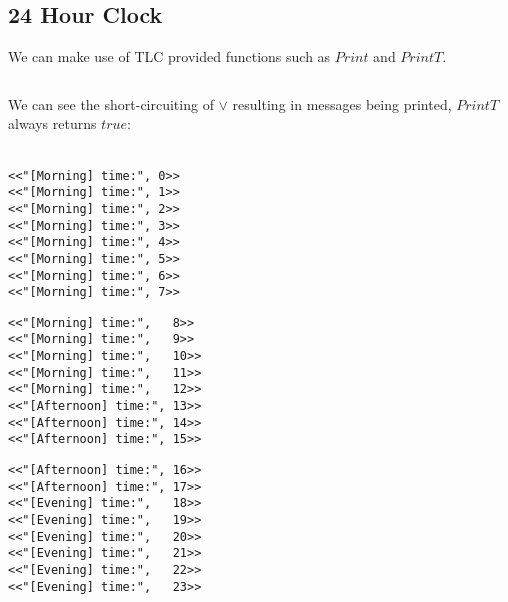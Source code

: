 \subsection{24 Hour Clock}
We can make use of TLC provided functions such as $Print$ and $PrintT$.
\\

\inputminted{text}{tla_plus/code/24HourClock.tla}
We can see the short-circuiting of $\lor$ resulting in messages being printed, $PrintT$ always returns $true$:
\\
\\ \begin{minipage}{.33\textwidth}
\begin{verbatim}
<<"[Morning] time:", 0>>
<<"[Morning] time:", 1>>
<<"[Morning] time:", 2>>
<<"[Morning] time:", 3>>
<<"[Morning] time:", 4>>
<<"[Morning] time:", 5>>
<<"[Morning] time:", 6>>
<<"[Morning] time:", 7>>
\end{verbatim}  
\end{minipage}
\begin{minipage}{.33\textwidth}
\begin{verbatim}
<<"[Morning] time:",   8>>
<<"[Morning] time:",   9>>
<<"[Morning] time:",   10>>
<<"[Morning] time:",   11>>
<<"[Morning] time:",   12>>
<<"[Afternoon] time:", 13>>
<<"[Afternoon] time:", 14>>
<<"[Afternoon] time:", 15>>
\end{verbatim}
\end{minipage}
\begin{minipage}{.33\textwidth}
\begin{verbatim}
<<"[Afternoon] time:", 16>>
<<"[Afternoon] time:", 17>>
<<"[Evening] time:",   18>>
<<"[Evening] time:",   19>>
<<"[Evening] time:",   20>>
<<"[Evening] time:",   21>>
<<"[Evening] time:",   22>>
<<"[Evening] time:",   23>>
\end{verbatim}
\end{minipage}



